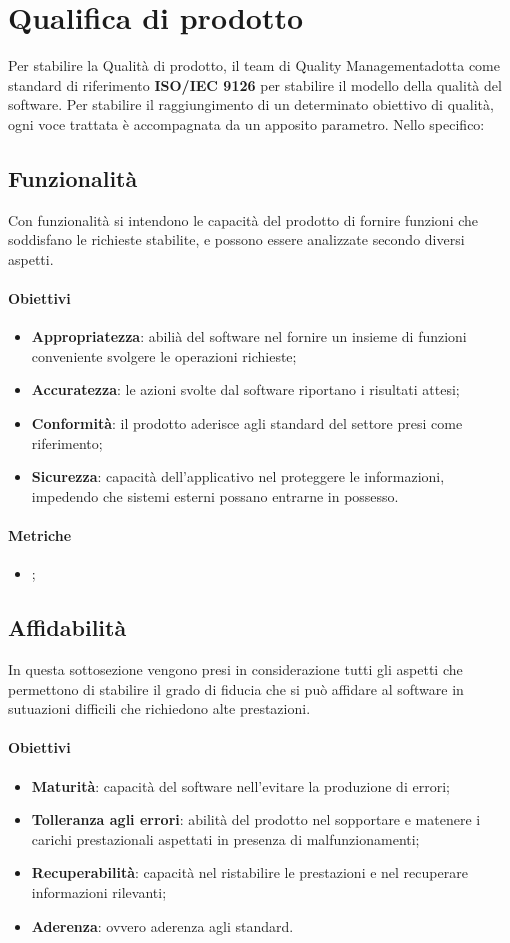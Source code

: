 \section{Qualifica di prodotto}
Per stabilire la Qualità di prodotto, il team di Quality Management\glo adotta come standard di riferimento \textbf{ISO/IEC 9126} per stabilire il modello della qualità del software. Per stabilire il raggiungimento di un determinato obiettivo di qualità, ogni voce trattata è accompagnata da un apposito parametro. Nello specifico:
\subsection{Funzionalità}
Con funzionalità si intendono le capacità del prodotto di fornire funzioni che soddisfano le richieste stabilite, e possono essere analizzate secondo diversi aspetti. 
\paragraph{Obiettivi}
\begin{itemize}
	\item \textbf{Appropriatezza}: abilià del software nel fornire un insieme di funzioni conveniente svolgere le operazioni richieste;
	\item \textbf{Accuratezza}: le azioni svolte dal software riportano i risultati attesi;
	\item \textbf{Conformità}: il prodotto aderisce agli standard del settore presi come riferimento;
	\item \textbf{Sicurezza}: capacità dell'applicativo nel proteggere le informazioni, impedendo che sistemi esterni possano entrarne in possesso.
\end{itemize}
\paragraph{Metriche}
\begin{itemize}
	\item ;
\end{itemize}
\subsection{Affidabilità}
In questa sottosezione vengono presi in considerazione tutti gli aspetti che permettono di stabilire il grado di fiducia che si può affidare al software in sutuazioni difficili che richiedono alte prestazioni.
\paragraph{Obiettivi}
\begin{itemize}
	\item \textbf{Maturità}: capacità del software nell'evitare la produzione di errori;
	\item \textbf{Tolleranza agli errori}: abilità del prodotto nel sopportare e matenere i carichi prestazionali aspettati in presenza di malfunzionamenti;
	\item \textbf{Recuperabilità}: capacità nel ristabilire le prestazioni e nel recuperare 	informazioni rilevanti;
	\item \textbf{Aderenza}: ovvero aderenza agli standard.
\end{itemize}
